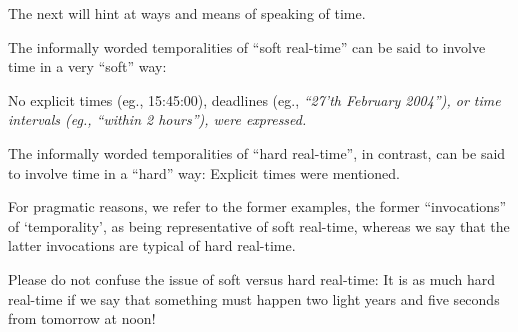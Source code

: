 {\pind The next  will hint
      at ways and means of speaking of time.
\afslut
      
\label{2ch14-intro.issues.soft+hard}
\begynd 
\pind The informally worded temporalities of ``soft real-time''  
\begynd
\pind can be said to involve time in a very ``soft'' way:

\pind No explicit times (eg., 15:45:00), deadlines \nyl (eg., \sl ``27'th
      February 2004''\rm), \nyl or 
      time intervals \nyl (eg., \sl ``within 2 hours''\rm), \nyl were
      expressed.  
\afslut

\pind The informally worded temporalities of ``hard real-time'', in contrast,  
\begynd
\pind can be said to involve time in a ``hard'' way:
\pind Explicit times were mentioned.
\afslut

\pos{\psno}{\mnewfoil}
\pind For pragmatic reasons, we refer to the former examples,
      the former ``invocations'' of `temporality', as being
      representative of soft real-time,
\pind whereas we say that the latter invocations are typical 
      of hard real-time.

\pind Please do not confuse the issue of soft versus hard real-time:
\begynd
\pind It is as much hard real-time if we say that something must
      happen two light years and five seconds from tomorrow at noon!
\afslut
\afslut

\pos{\psno}{\mnewfoil}
}
